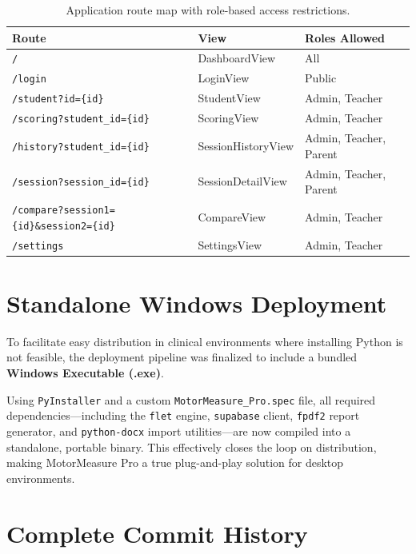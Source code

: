 \documentclass[12pt,a4paper]{article}
\begin{document}
\begin{table}[H]
\centering
\begin{tabular}{@{}lll@{}}
\toprule
\textbf{Route} & \textbf{View} & \textbf{Roles Allowed} \\
\midrule
\texttt{/} & DashboardView & All \\
\texttt{/login} & LoginView & Public \\
\texttt{/student?id=\{id\}} & StudentView & Admin, Teacher \\
\texttt{/scoring?student\_id=\{id\}} & ScoringView & Admin, Teacher \\
\texttt{/history?student\_id=\{id\}} & SessionHistoryView & Admin, Teacher, Parent \\
\texttt{/session?session\_id=\{id\}} & SessionDetailView & Admin, Teacher, Parent \\
\texttt{/compare?session1=\{id\}\&session2=\{id\}} & CompareView & Admin, Teacher \\
\texttt{/settings} & SettingsView & Admin, Teacher \\
\bottomrule
\end{tabular}
\caption{Application route map with role-based access restrictions.}
\end{table}

\section{Standalone Windows Deployment}

To facilitate easy distribution in clinical environments where installing Python is not feasible, the deployment pipeline was finalized to include a bundled \textbf{Windows Executable (.exe)}.

Using \texttt{PyInstaller} and a custom \texttt{MotorMeasure\_Pro.spec} file, all required dependencies—including the \texttt{flet} engine, \texttt{supabase} client, \texttt{fpdf2} report generator, and \texttt{python-docx} import utilities—are now compiled into a standalone, portable binary. This effectively closes the loop on distribution, making MotorMeasure Pro a true plug-and-play solution for desktop environments.

\section{Complete Commit History}
\end{document}
